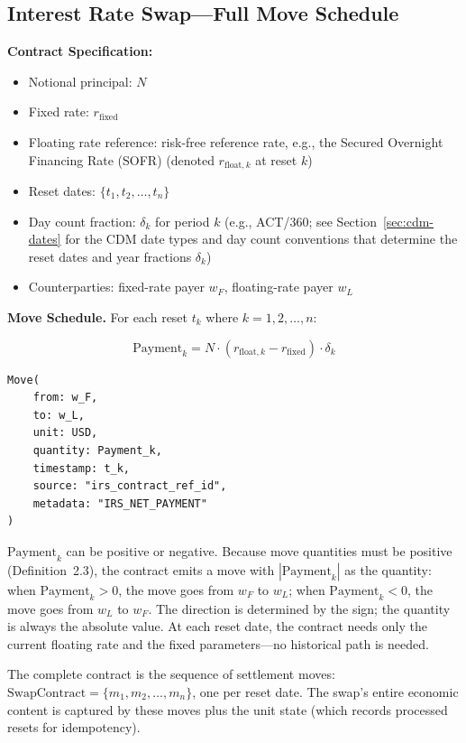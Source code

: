 \documentclass[11pt,a4paper]{article}
\begin{document}
\subsection{Interest Rate Swap---Full Move Schedule}

\noindent\textbf{Contract Specification:}
\begin{itemize}[nosep]
\item Notional principal: $N$
\item Fixed rate: $r_{\text{fixed}}$
\item Floating rate reference: risk-free reference rate, e.g., the Secured Overnight Financing Rate (SOFR) (denoted $r_{\text{float},k}$ at reset $k$)
\item Reset dates: $\{t_1, t_2, \ldots, t_n\}$
\item Day count fraction: $\delta_k$ for period $k$ (e.g., ACT/360; see Section~\ref{sec:cdm-dates} for the CDM date types and day count conventions that determine the reset dates and year fractions $\delta_k$)
\item Counterparties: fixed-rate payer $w_F$, floating-rate payer $w_L$
\end{itemize}

\noindent\textbf{Move Schedule.}
For each reset $t_k$ where $k = 1, 2, \ldots, n$:

\[
\text{Payment}_k = N \cdot (r_{\text{float},k} - r_{\text{fixed}}) \cdot \delta_k
\]

\begin{lstlisting}
Move(
    from: w_F,
    to: w_L,
    unit: USD,
    quantity: Payment_k,
    timestamp: t_k,
    source: "irs_contract_ref_id",
    metadata: "IRS_NET_PAYMENT"
)
\end{lstlisting}

$\text{Payment}_k$ can be positive or negative. Because move quantities must be positive (Definition~2.3), the contract emits a move with $|\text{Payment}_k|$ as the quantity: when $\text{Payment}_k > 0$, the move goes from $w_F$ to $w_L$; when $\text{Payment}_k < 0$, the move goes from $w_L$ to $w_F$. The direction is determined by the sign; the quantity is always the absolute value. At each reset date, the contract needs only the current floating rate and the fixed parameters---no historical path is needed.

The complete contract is the sequence of settlement moves: $\text{SwapContract} = \{m_1, m_2, \ldots, m_n\}$, one per reset date. The swap's entire economic content is captured by these moves plus the unit state (which records processed resets for idempotency).
\end{document}
